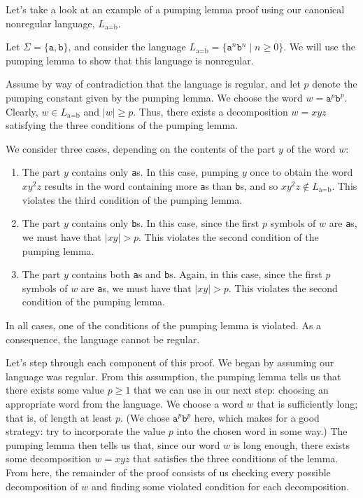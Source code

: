 Let's take a look at an example of a pumping lemma proof using our canonical nonregular language, $L_{\text{a}=\text{b}}$.

\begin{example}
Let $\Sigma = \{\texttt{a}, \texttt{b}\}$, and consider the language $L_{\text{a}=\text{b}} = \{\texttt{a}^{n}\texttt{b}^{n} \mid n \geq 0\}$. We will use the pumping lemma to show that this language is nonregular.

Assume by way of contradiction that the language is regular, and let $p$ denote the pumping constant given by the pumping lemma. We choose the word $w = \texttt{a}^{p}\texttt{b}^{p}$. Clearly, $w \in L_{\text{a}=\text{b}}$ and $|w| \geq p$. Thus, there exists a decomposition $w = xyz$ satisfying the three conditions of the pumping lemma.

We consider three cases, depending on the contents of the part $y$ of the word $w$:
\begin{enumerate}
\item The part $y$ contains only \texttt{a}s. In this case, pumping $y$ once to obtain the word $xy^{2}z$ results in the word containing more \texttt{a}s than \texttt{b}s, and so $xy^{2}z \not\in L_{\text{a}=\text{b}}$. This violates the third condition of the pumping lemma.

\item The part $y$ contains only \texttt{b}s. In this case, since the first $p$ symbols of $w$ are \texttt{a}s, we must have that $|xy| > p$. This violates the second condition of the pumping lemma.

\item The part $y$ contains both \texttt{a}s and \texttt{b}s. Again, in this case, since the first $p$ symbols of $w$ are \texttt{a}s, we must have that $|xy| > p$. This violates the second condition of the pumping lemma.
\end{enumerate}
In all cases, one of the conditions of the pumping lemma is violated. As a consequence, the language cannot be regular.
\end{example}

Let's step through each component of this proof. We began by assuming our language was regular. From this assumption, the pumping lemma tells us that there exists some value $p \geq 1$ that we can use in our next step: choosing an appropriate word from the language. We choose a word $w$ that is sufficiently long; that is, of length at least $p$. (We chose $\texttt{a}^{p}\texttt{b}^{p}$ here, which makes for a good strategy: try to incorporate the value $p$ into the chosen word in some way.) The pumping lemma then tells us that, since our word $w$ is long enough, there exists some decomposition $w = xyz$ that satisfies the three conditions of the lemma. From here, the remainder of the proof consists of us checking every possible decomposition of $w$ and finding some violated condition for each decomposition.

